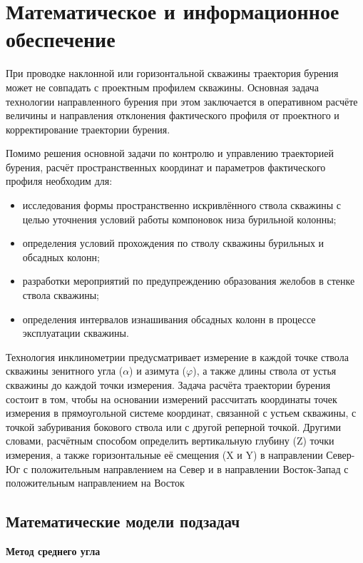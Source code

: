 \newpage
\section{Математическое и информационное обеспечение }

При проводке наклонной или горизонтальной скважины траектория бурения может не совпадать с проектным профилем скважины. Основная
задача технологии направленного бурения при этом заключается в оперативном расчёте величины и направления отклонения фактического профиля от
проектного и корректирование траектории бурения.

Помимо решения основной задачи по контролю и управлению траекторией бурения, расчёт пространственных координат и параметров фактического профиля необходим для:
\begin{itemize}
  \item исследования формы пространственно искривлённого ствола скважины с целью уточнения условий работы компоновок низа бурильной колонны;
  \item определения условий прохождения по стволу скважины бурильных и обсадных колонн;
  \item разработки мероприятий по предупреждению образования желобов в стенке ствола скважины;
  \item определения интервалов изнашивания обсадных колонн в процессе эксплуатации скважины.
\end{itemize}

Технология инклинометрии предусматривает измерение в каждой точке ствола скважины зенитного угла ($ \alpha $) и азимута ($ \varphi $), а также длины ствола от
устья скважины до каждой точки измерения. Задача расчёта траектории бурения состоит в том, чтобы на основании измерений рассчитать координаты
точек измерения в прямоугольной системе координат, связанной с устьем скважины, с точкой забуривания бокового ствола или с другой реперной
точкой. Другими словами, расчётным способом определить вертикальную глубину (Z) точки измерения, а также горизонтальные её смещения (X и Y) в
направлении Север-Юг с положительным направлением на Север и в направлении Восток-Запад с положительным направлением на Восток

\subsection{Математические модели подзадач}

\textbf{Метод среднего угла}


